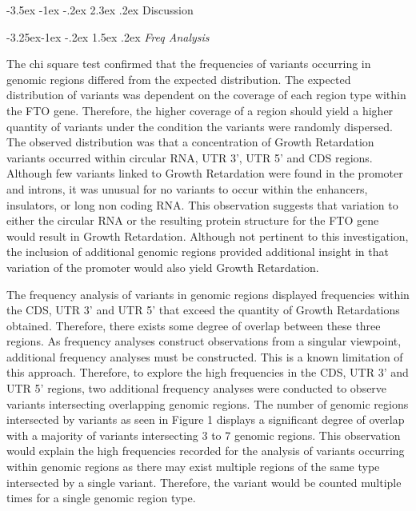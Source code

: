 \documentclass[11pt]{article}
\makeatletter
\renewcommand\section{\@startsection {section}{1}{\z@}%
                                       {-3.5ex \@plus -1ex \@minus -.2ex}%
                                       {2.3ex \@plus.2ex}%
                                       {\normalfont\fontfamily{phv}\fontsize{16}{19}\bfseries}}
\renewcommand\subsection{\@startsection{subsection}{2}{\z@}%
                                         {-3.25ex\@plus -1ex \@minus -.2ex}%
                                         {1.5ex \@plus .2ex}%
                                         {\normalfont\fontfamily{phv}\fontsize{14}{17}\bfseries}}
\makeatother
\begin{document}
\section{Discussion} \label{s:discussion}


\subsection{
\emph{Freq Analysis}} \label{s:conclusion}

The chi square test confirmed that the frequencies of variants occurring in genomic regions differed from the expected distribution. The expected distribution of variants was dependent on the coverage of each region type within the FTO gene. Therefore, the higher coverage of a region should yield a higher quantity of variants under the condition the variants were randomly dispersed. The observed distribution was that a concentration of Growth Retardation variants occurred within circular RNA, UTR 3’, UTR 5’ and CDS regions. Although few variants linked to Growth Retardation were found in the promoter and introns, it was unusual for no variants to occur within the enhancers, insulators, or long non coding RNA. This observation suggests that variation to either the circular RNA or the resulting protein structure for the FTO gene would result in Growth Retardation. Although not pertinent to this investigation, the inclusion of additional genomic regions provided additional insight in that variation of the promoter would also yield Growth Retardation.  

The frequency analysis of variants in genomic regions displayed frequencies within the CDS, UTR 3’ and UTR 5’ that exceed the quantity of Growth Retardations obtained. Therefore, there exists some degree of overlap between these three regions. As frequency analyses construct observations from a singular viewpoint, additional frequency analyses must be constructed. This is a known limitation of this approach. Therefore, to explore the high frequencies in the CDS, UTR 3’ and UTR 5’ regions, two additional frequency analyses were conducted to observe variants intersecting overlapping genomic regions. The number of genomic regions intersected by variants as seen in Figure 1 displays a significant degree of overlap with a majority of variants intersecting 3 to 7 genomic regions. This observation would explain the high frequencies recorded for the analysis of variants occurring within genomic regions as there may exist multiple regions of the same type intersected by a single variant. Therefore, the variant would be counted multiple times for a single genomic region type.  
\end{document}

